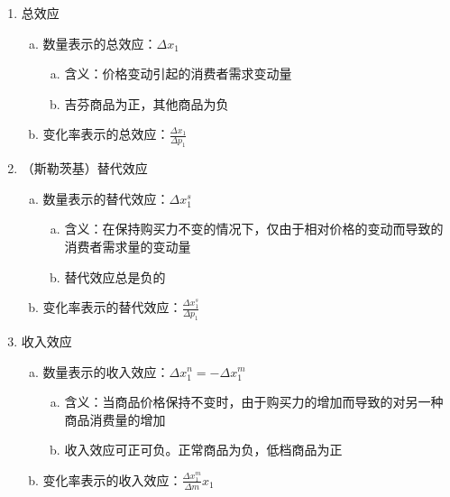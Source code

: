 \documentclass[12pt]{book}
\begin{document}
\begin{enumerate}[(1)]
    \item 总效应
          \begin{enumerate}[a.]
              \item 数量表示的总效应：$\Delta x_{1}$
                    \begin{enumerate}[(a)]
                        \item 含义：价格变动引起的消费者需求变动量
                        \item 吉芬商品为正，其他商品为负
                    \end{enumerate}
              \item 变化率表示的总效应：$\frac{\Delta x_1}{\Delta p_{1}}$
          \end{enumerate}
    \item （斯勒茨基）替代效应
          \begin{enumerate}[a.]
              \item 数量表示的替代效应：$\Delta x_{1}^{s}$
                    \begin{enumerate}[(a)]
                        \item 含义：在保持购买力不变的情况下，仅由于相对价格的变动而导致的消费者需求量的变动量
                        \item 替代效应总是负的
                    \end{enumerate}
              \item 变化率表示的替代效应：$\frac{ \Delta x_{1}^{s}  }{ \Delta p_{1} }$
          \end{enumerate}
    \item 收入效应
          \begin{enumerate}[a.]
              \item 数量表示的收入效应：$\Delta x_{1}^{n}=-\Delta x_{1}^{m}$
                    \begin{enumerate}[(a)]
                        \item 含义：当商品价格保持不变时，由于购买力的增加而导致的对另一种商品消费量的增加
                        \item 收入效应可正可负。正常商品为负，低档商品为正
                    \end{enumerate}
              \item 变化率表示的收入效应：$\frac{ \Delta x_{1}^{m} }{ \Delta m }x_{1}$
          \end{enumerate}
\end{enumerate}
\end{document}
